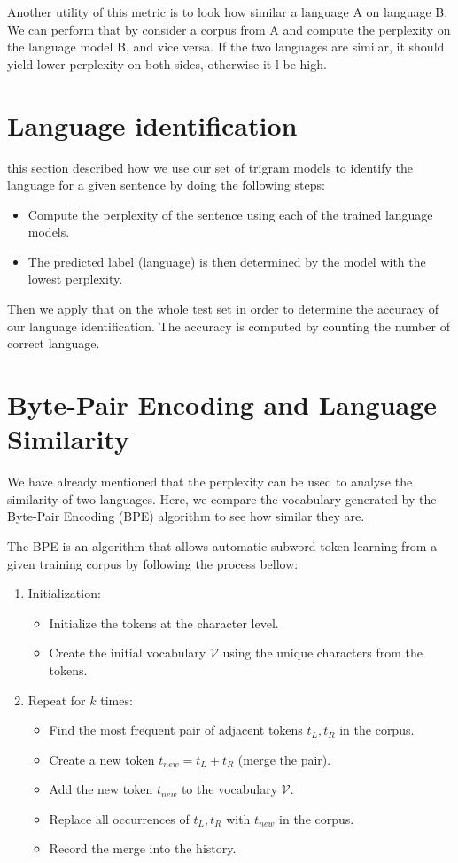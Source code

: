 Another utility of this metric is to look how similar a language A on language B. We can perform that by consider a corpus from A and compute the perplexity on the language model B, and vice versa. If the two languages are similar, it should yield lower perplexity on both sides, otherwise it l be high.
\section{Language identification}
this section described how we use our set of trigram models to identify the language for a given sentence by doing the following steps:
\begin{itemize}
    \item Compute the perplexity of the sentence using each of the trained language models.
    \item The predicted label (language) is then determined by the model with the lowest perplexity.
\end{itemize}
Then we apply that on the whole test set in order to determine the accuracy of our language identification. The accuracy is computed by counting the number of correct language.
\section{Byte-Pair Encoding and Language Similarity}
We have already mentioned that the perplexity can be used to analyse the similarity of two languages. Here, we compare the vocabulary generated by the Byte-Pair Encoding (BPE) algorithm to see how similar they are.

The BPE is an algorithm that allows automatic subword token learning from a given training corpus by following the process bellow:
\begin{enumerate}
    \item Initialization:
    \begin{itemize}
    \item Initialize the tokens at the character level.
    \item Create the initial vocabulary $\mathcal{V}$ using the unique characters from the tokens.
    \end{itemize}

    \item Repeat for $k$ times:
    \begin{itemize}
        \item Find the most frequent pair of adjacent tokens $t_L, t_R$ in the corpus.
        \item Create a new token $t_{new} = t_L + t_R$ (merge the pair).
        \item Add the new token $t_{new}$ to the vocabulary $\mathcal{V}$.
        \item Replace all occurrences of $t_L, t_R$ with $t_{new}$ in the corpus.
        \item Record the merge into the history.
    \end{itemize}
\end{enumerate}

